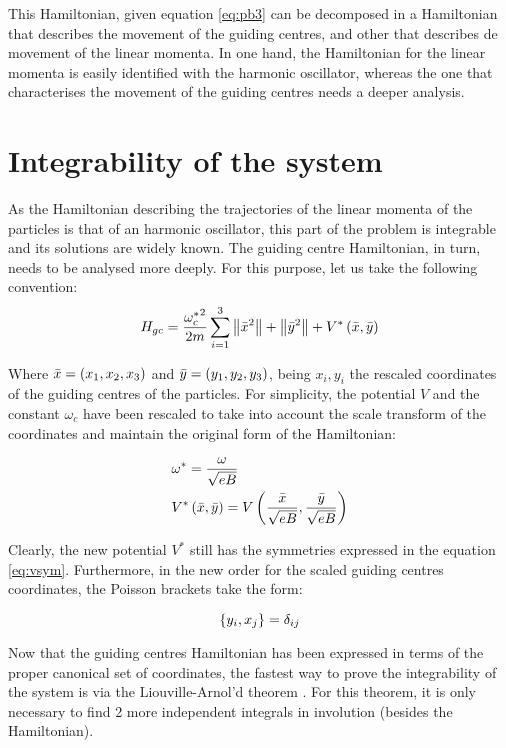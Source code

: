This Hamiltonian, given equation \eqref{eq:pb3} can be decomposed in a Hamiltonian that describes the movement of the guiding centres, and other that describes de movement of the linear momenta. In one hand, the Hamiltonian for the linear momenta is easily identified with the harmonic oscillator, whereas the one that characterises the movement of the guiding centres needs a deeper analysis.\\

\section{Integrability of the system}
As the Hamiltonian describing the trajectories of the linear momenta of the particles is that of an harmonic oscillator, this part of the problem is integrable and its solutions are widely known. The guiding centre Hamiltonian, in turn, needs to be analysed more deeply. For this purpose, let us take the following convention:\\


\begin{equation}
H_{gc} = \frac{{\omega_c^*}^2}{2m} \sum_{i=1}^{3} \left\lVert \bar{x}^2 \right\rVert + \left\lVert \bar{y}^2 \right\rVert
+ V^*\left( \bar{x},\bar{y} \right)
\label{eq:hamgc}
\end{equation}

Where $\bar{x} = \left( x_1,x_2,x_3 \right)$ and $\bar{y} = \left( y_1,y_2,y_3 \right)$, being $x_i,y_i$ the rescaled coordinates of the guiding centres of the particles. For simplicity, the potential $V$ and the constant $\omega_c$ have been rescaled to take into account the scale transform of the coordinates and maintain the original form of the Hamiltonian:

\begin{align*}
&\omega^* = \frac{\omega}{\sqrt{eB}}\\
&V^*\left( \bar{x},\bar{y} \right) = V\left( \frac{\bar{x}}{\sqrt{eB}},\frac{\bar{y}}{\sqrt{eB}} \right)
\end{align*}

Clearly, the new potential $V^*$ still has the symmetries expressed in the equation \eqref{eq:vsym}. Furthermore, in the new order for the scaled guiding centres coordinates, the Poisson brackets take the form:

\begin{equation}
\left\lbrace y_i, x_j \right\rbrace = \delta_{ij}
\label{lastpb}
\end{equation}

Now that the guiding centres Hamiltonian has been expressed in terms of the proper canonical set of coordinates, the fastest way to prove the integrability of the system is via the Liouville-Arnol'd theorem \cite[Sect. 49]{arnold}. For this theorem, it is only necessary to find 2 more independent integrals in involution (besides the Hamiltonian).\\

